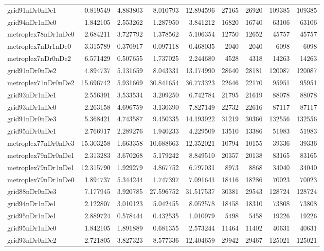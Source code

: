 \begin{longtable}{|l|r|r|r|r|r|r|r|r|}
grid91nDr0nDe1 & 0.819549 & 4.883803 & 8.010793 & 12.894596 & 27165 & 26920 & 109385 & 109385 \\
grid94nDr1nDe0 & 1.842105 & 2.553262 & 1.287950 & 3.841212 & 16820 & 16740 & 63106 & 63106 \\
metroplex78nDr1nDe0 & 2.684211 & 3.727792 & 1.378562 & 5.106354 & 12750 & 12652 & 45757 & 45757 \\
metroplex7nDr1nDe0 & 3.315789 & 0.370917 & 0.097118 & 0.468035 & 2040 & 2040 & 6098 & 6098 \\
metroplex7nDr0nDe2 & 6.571429 & 0.507655 & 1.737025 & 2.244680 & 4528 & 4318 & 14263 & 14263 \\
grid91nDr0nDe2 & 4.894737 & 5.131659 & 8.043331 & 13.174990 & 28640 & 28181 & 120087 & 120087 \\
metroplex71nDr0nDe2 & 15.696742 & 5.931669 & 30.841654 & 36.773323 & 22646 & 22170 & 95951 & 95951 \\
grid93nDr1nDe1 & 2.556391 & 3.533534 & 3.209250 & 6.742784 & 21795 & 21619 & 88078 & 88078 \\
grid93nDr1nDe0 & 2.263158 & 4.696759 & 3.130390 & 7.827149 & 22732 & 22616 & 87117 & 87117 \\
grid91nDr0nDe3 & 5.368421 & 4.743587 & 9.450335 & 14.193922 & 31219 & 30366 & 132556 & 132556 \\
grid95nDr0nDe1 & 2.766917 & 2.289276 & 1.940233 & 4.229509 & 13510 & 13386 & 51983 & 51983 \\
metroplex77nDr0nDe3 & 15.303258 & 1.663358 & 10.688663 & 12.352021 & 10794 & 10155 & 39336 & 39336 \\
metroplex79nDr0nDe1 & 2.313283 & 3.670268 & 5.179242 & 8.849510 & 20357 & 20138 & 83165 & 83165 \\
metroplex79nDr1nDe1 & 12.315790 & 1.929279 & 4.867752 & 6.797031 & 8973 & 8868 & 34040 & 34040 \\
metroplex79nDr1nDe0 & 1.894737 & 5.344244 & 1.747397 & 7.091641 & 18416 & 18286 & 70023 & 70023 \\
grid88nDr0nDe3 & 7.177945 & 3.920785 & 27.596752 & 31.517537 & 30381 & 29543 & 128724 & 128724 \\
grid94nDr1nDe1 & 2.122807 & 3.010123 & 5.042455 & 8.052578 & 18458 & 18310 & 73808 & 73808 \\
grid95nDr1nDe1 & 2.889724 & 0.578444 & 0.432535 & 1.010979 & 5498 & 5458 & 19226 & 19226 \\
grid95nDr1nDe0 & 1.842105 & 1.891889 & 0.681355 & 2.573244 & 11464 & 11402 & 40631 & 40631 \\
grid93nDr0nDe2 & 2.721805 & 3.827323 & 8.577336 & 12.404659 & 29942 & 29467 & 125021 & 125021 \\

\end{longtable}
